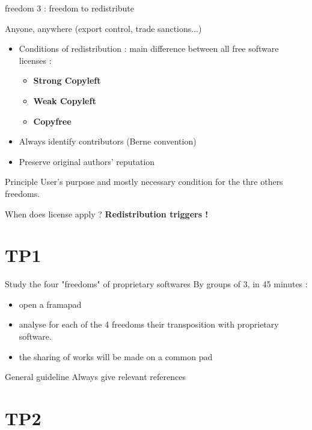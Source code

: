 \documentclass{beamer}
\begin{document}
\begin{frame}{freedom 3 : freedom to redistribute}

Anyone, anywhere (export control, trade sanctions...)

  \begin{itemize}
  \item Conditions of redistribution : main difference between all free software licenses :
    \begin{itemize}
    \item \textbf{Strong Copyleft}
    \item \textbf{Weak Copyleft}
    \item \textbf{Copyfree}
    \end{itemize}
  \item Always identify contributors (Berne convention)
  \item Preserve original authors' reputation
  \end{itemize}
\begin{alertblock}{Principle}
    User's purpose and mostly necessary condition for the thre others freedoms.
  \end{alertblock}

\begin{alertblock}{When does license apply ?}
\textbf{Redistribution triggers !}
 \end{alertblock}
\end{frame}

\section{TP1}

\begin{frame}{Study the four "freedoms" of proprietary softwares}
  By groups of 3, in 45 minutes :
  \begin{itemize}
  \item open a framapad
  \item analyse for each of the 4 freedoms their transposition with proprietary software.
  \item the sharing of works will be made on a common pad
  \end{itemize}

  \begin{alertblock}{General guideline}
	Always give relevant references 
  \end{alertblock}
\end{frame}

\section{TP2}
\end{document}
